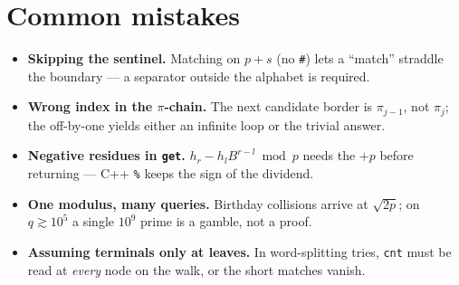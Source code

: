 \section{Common mistakes}
\begin{itemize}
\item \textbf{Skipping the sentinel.} Matching on $p+s$ (no
\texttt{\#}) lets a ``match'' straddle the boundary --- a
separator outside the alphabet is required.
\item \textbf{Wrong index in the $\pi$-chain.} The next candidate
border is $\pi_{j-1}$, not $\pi_j$; the off-by-one yields either
an infinite loop or the trivial answer.
\item \textbf{Negative residues in \texttt{get}.} $h_r - h_l
B^{r-l} \bmod p$ needs the $+p$ before returning --- C++ \texttt{\%}
keeps the sign of the dividend.
\item \textbf{One modulus, many queries.} Birthday collisions
arrive at $\sqrt{2p}$; on $q \gtrsim 10^5$ a single $10^9$ prime
is a gamble, not a proof.
\item \textbf{Assuming terminals only at leaves.} In word-splitting
tries, \texttt{cnt} must be read at \emph{every} node on the walk,
or the short matches vanish.
\end{itemize}

